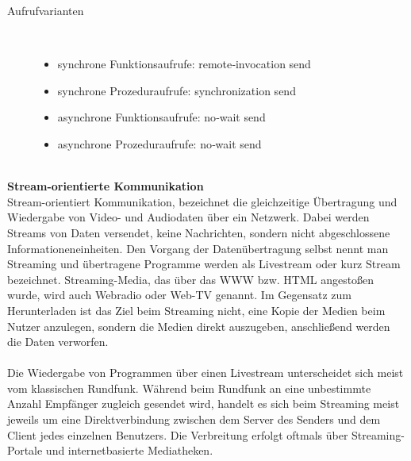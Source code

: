 \documentclass[a4paper,12pt]{article}
\begin{document}
\newpage
\noindent
\begin{description}
    \item[Aufrufvarianten] ~\par
    \begin{itemize}
        \item synchrone Funktionsaufrufe: remote‑invocation send
        \item synchrone Prozeduraufrufe: synchronization send
        \item asynchrone Funktionsaufrufe: no‑wait send
        \item asynchrone Prozeduraufrufe: no‑wait send\\\\
    \end{itemize} 
\end{description}
\textbf{Stream-orientierte Kommunikation}\\
Stream-orientiert Kommunikation, bezeichnet die gleichzeitige Übertragung und Wiedergabe von Video- und Audiodaten über ein Netzwerk.
Dabei werden Streams von Daten versendet, keine Nachrichten, sondern nicht abgeschlossene Informationeneinheiten.
Den Vorgang der Datenübertragung selbst nennt man Streaming und übertragene Programme werden als Livestream oder kurz Stream bezeichnet. Streaming-Media, das über das WWW bzw. HTML angestoßen wurde, wird auch Webradio oder Web-TV genannt. Im Gegensatz zum Herunterladen ist das Ziel beim Streaming nicht, eine Kopie der Medien beim Nutzer anzulegen, sondern die Medien direkt auszugeben, anschließend werden die Daten verworfen.
\\\\
Die Wiedergabe von Programmen über einen Livestream unterscheidet sich meist vom klassischen Rundfunk. Während beim Rundfunk an eine unbestimmte Anzahl Empfänger zugleich gesendet wird, handelt es sich beim Streaming meist jeweils um eine Direktverbindung zwischen dem Server des Senders und dem Client jedes einzelnen Benutzers. Die Verbreitung erfolgt oftmals über Streaming-Portale und internetbasierte Mediatheken.
\cite{communication2}
\newpage
\noindent
\end{document}
